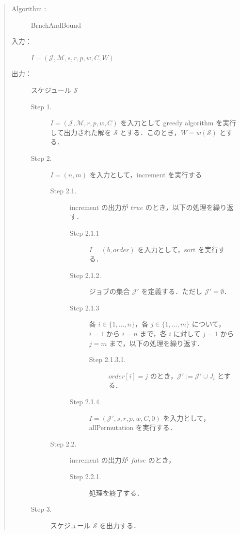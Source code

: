 \documentclass[12pt]{optlab-bachelor}
\begin{document}
\begin{quote}
  \begin{description}
    \item[{\sc Algorithm : }]  {\sc BrnchAndBound}
    \item[入力：] $I = (\mathcal{J},\mathcal{M},s,r,p,w,C,W)$
    \item[出力：] スケジュール $\mathcal{S}$
    \begin{description}
      \item[Step 1.] $I = (\mathcal{J},\mathcal{M},r,p,w,C)$ を入力として {\sc greedy algorithm} を実行して出力された解を $\mathcal{S}$ とする．このとき，$W = w(\mathcal{S})$ とする．
      \item[Step 2.] $I = (n,m)$ を入力として，{\sc increment} を実行する
      \begin{description}
        \item[Step 2.1.] {\sc increment} の出力が $true$ のとき，以下の処理を繰り返す．
        \begin{description}
          \item[Step 2.1.1] $I = (b,order)$ を入力として，{\sc sort} を実行する．
          \item[Step 2.1.2.] ジョブの集合 $\mathcal{J}'$ を定義する．ただし $\mathcal{J}' = \emptyset$．
          \item[Step 2.1.3] 各 $i \in \{1,\ldots,n\}$，各 $j \in \{1,\ldots,m\}$ について，$i = 1$ から $i = n$ まで，各 $i$ に対して $j = 1$ から $j = m$ まで，以下の処理を繰り返す．
          \begin{description}
            \item[Step 2.1.3.1.] $order[i] = j$ のとき，$\mathcal{J}' :=\mathcal{J}' \cup J_i$ とする．
          \end{description}
          \item[Step 2.1.4.] $I = (\mathcal{J}',s,r,p,w,C,0)$ を入力として，\\{allPermutation} を実行する．
        \end{description}
        \item[Step 2.2.] {\sc increment} の出力が $false$ のとき，
        \begin{description}
          \item[Step 2.2.1.] 処理を終了する．
        \end{description}
      \end{description}
      \item[Step 3.] スケジュール $\mathcal{S}$ を出力する．
    \end{description}
  \end{description}
\end{quote}
\end{document}
